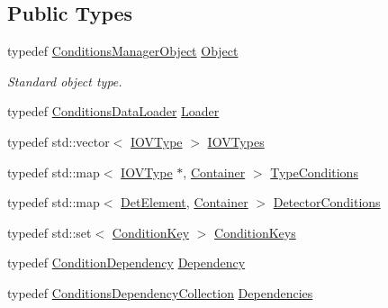 \subsection*{Public Types}
\begin{DoxyCompactItemize}
\item 
typedef \hyperlink{class_d_d4hep_1_1_conditions_1_1_conditions_manager_object}{Conditions\+Manager\+Object} \hyperlink{class_d_d4hep_1_1_conditions_1_1_conditions_manager_ae865f49d144d8ba5be9eec3e1d8fec94}{Object}
\begin{DoxyCompactList}\small\item\em Standard object type. \end{DoxyCompactList}\item 
typedef \hyperlink{class_d_d4hep_1_1_conditions_1_1_conditions_data_loader}{Conditions\+Data\+Loader} \hyperlink{class_d_d4hep_1_1_conditions_1_1_conditions_manager_acd0f1e242240cc1c07a0d029a716a718}{Loader}
\item 
typedef std\+::vector$<$ \hyperlink{class_d_d4hep_1_1_i_o_v_type}{I\+O\+V\+Type} $>$ \hyperlink{class_d_d4hep_1_1_conditions_1_1_conditions_manager_aad65a81edf6d4cf81f33f660537587f8}{I\+O\+V\+Types}
\item 
typedef std\+::map$<$ \hyperlink{class_d_d4hep_1_1_i_o_v_type}{I\+O\+V\+Type} $\ast$, \hyperlink{class_d_d4hep_1_1_conditions_1_1_container}{Container} $>$ \hyperlink{class_d_d4hep_1_1_conditions_1_1_conditions_manager_a8a7e3616b547ab4aadf035d8ef70f844}{Type\+Conditions}
\item 
typedef std\+::map$<$ \hyperlink{class_d_d4hep_1_1_geometry_1_1_det_element}{Det\+Element}, \hyperlink{class_d_d4hep_1_1_conditions_1_1_container}{Container} $>$ \hyperlink{class_d_d4hep_1_1_conditions_1_1_conditions_manager_a27022fcc820a7fd132d3f74ed4ed6c1f}{Detector\+Conditions}
\item 
typedef std\+::set$<$ \hyperlink{class_d_d4hep_1_1_conditions_1_1_condition_key}{Condition\+Key} $>$ \hyperlink{class_d_d4hep_1_1_conditions_1_1_conditions_manager_a8dd76f9acef2c8d3b7970e266fe7eff6}{Condition\+Keys}
\item 
typedef \hyperlink{class_d_d4hep_1_1_conditions_1_1_condition_dependency}{Condition\+Dependency} \hyperlink{class_d_d4hep_1_1_conditions_1_1_conditions_manager_a8787c205ff23a5883d7bf98f9b06b408}{Dependency}
\item 
typedef \hyperlink{class_d_d4hep_1_1_conditions_1_1_conditions_dependency_collection}{Conditions\+Dependency\+Collection} \hyperlink{class_d_d4hep_1_1_conditions_1_1_conditions_manager_aab778cfbe096ae8ad20a0bdbb047ad32}{Dependencies}
\end{DoxyCompactItemize}
